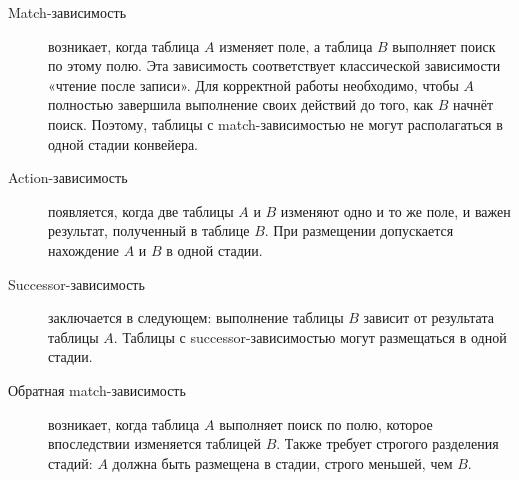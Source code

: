 \begin{description}
	\item[Match-зависимость] возникает, когда таблица \(A\) изменяет поле, а таблица \(B\) выполняет поиск по этому полю. Эта зависимость соответствует классической зависимости «чтение после записи». Для корректной работы необходимо, чтобы \(A\) полностью завершила выполнение своих действий до того, как \(B\) начнёт поиск. Поэтому, таблицы с match-зависимостью не могут располагаться в одной стадии конвейера.
	
	\item[Action-зависимость] появляется, когда две таблицы \(A\) и \(B\) изменяют одно и то же поле, и важен результат, полученный в таблице \(B\). При размещении допускается нахождение \(A\) и \(B\) в одной стадии.
	
	\item[Successor-зависимость] заключается в следующем: выполнение таблицы \(B\) зависит от результата таблицы \(A\). Таблицы с successor-зависимостью могут размещаться в одной стадии.
	
	\item[Обратная match-зависимость] возникает, когда таблица \(A\) выполняет поиск по полю, которое впоследствии изменяется таблицей \(B\). Также требует строгого разделения стадий: \(A\) должна быть размещена в стадии, строго меньшей, чем \(B\).
\end{description}